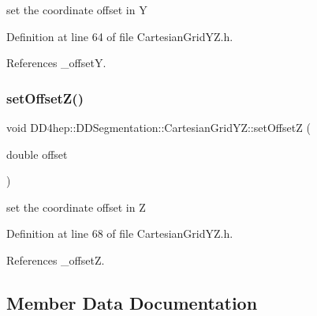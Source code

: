 set the coordinate offset in Y 



Definition at line 64 of file Cartesian\+Grid\+Y\+Z.\+h.



References \+\_\+offsetY.

\hypertarget{class_d_d4hep_1_1_d_d_segmentation_1_1_cartesian_grid_y_z_a396883c33c1eb30aac6e5dc2c21a7f66}{}\label{class_d_d4hep_1_1_d_d_segmentation_1_1_cartesian_grid_y_z_a396883c33c1eb30aac6e5dc2c21a7f66} 
\subsubsection{\texorpdfstring{set\+Offset\+Z()}{setOffsetZ()}}
{\footnotesize\ttfamily void D\+D4hep\+::\+D\+D\+Segmentation\+::\+Cartesian\+Grid\+Y\+Z\+::set\+OffsetZ (\begin{DoxyParamCaption}\item[{double}]{offset }\end{DoxyParamCaption})\hspace{0.3cm}{\ttfamily [inline]}}



set the coordinate offset in Z 



Definition at line 68 of file Cartesian\+Grid\+Y\+Z.\+h.



References \+\_\+offsetZ.



\subsection{Member Data Documentation}
\hypertarget{class_d_d4hep_1_1_d_d_segmentation_1_1_cartesian_grid_y_z_ac1bd277d62423bb439394096d82a0ea4}{}\label{class_d_d4hep_1_1_d_d_segmentation_1_1_cartesian_grid_y_z_ac1bd277d62423bb439394096d82a0ea4} 
